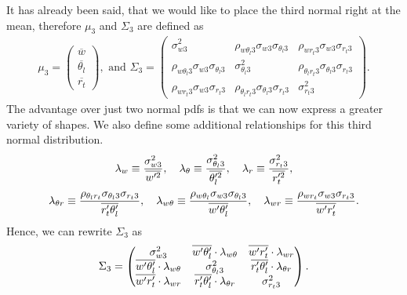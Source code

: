 It has already been said,
that we would like to place the third normal right at the mean,
therefore $\mu_3$ and $\Sigma_3$ are defined as
\begin{align}
    \mu_3 =
    \begin{pmatrix}
        \overline{w}        \\
        \overline{\theta_l} \\
        \overline{r_t}
    \end{pmatrix},
    \text{ and }
    \Sigma_3 =
    \begin{pmatrix}
        \sigma_{w 3}^2 &
        \rho_{w \theta_l 3} \sigma_{w 3} \sigma_{\theta_l 3} &
        \rho_{w r_t 3} \sigma_{w 3} \sigma_{r_t 3} \\
        \rho_{w \theta_l 3} \sigma_{w 3} \sigma_{\theta_l 3} &
        \sigma_{\theta_l 3}^2 &
        \rho_{\theta_l r_t 3} \sigma_{\theta_l 3} \sigma_{r_t 3} \\
        \rho_{w r_t 3} \sigma_{w 3} \sigma_{r_t 3} &
        \rho_{\theta_l r_t 3} \sigma_{\theta_l 3} \sigma_{r_t 3} &
        \sigma_{r_t 3}^2
    \end{pmatrix}.
\end{align}
The advantage over just two normal \glspl{pdf} is that
we can now express a greater variety of shapes.
We also define some additional relationships for this third normal distribution.
\begin{align}
    \label{eq:lambda}
    \lambda_w \equiv \frac{\sigma_{w 3}^2}{\overline{w'^2}}, \quad
    \lambda_\theta \equiv \frac{\sigma_{\theta_l 3}^2}{\overline{\theta_l'^2}}, \quad
    \lambda_r \equiv \frac{\sigma_{r_t 3}^2}{\overline{r_t'^2}},
\end{align}
\begin{align}
    \label{eq:lambda_two}
    \lambda_{\theta r} \equiv
    \frac{\rho_{\theta_l r_t} \sigma_{\theta_l 3} \sigma_{r_t 3}}{\overline{r_t' \theta_l'}}, \quad
    \lambda_{w \theta} \equiv
    \frac{\rho_{w \theta_l} \sigma_{w 3} \sigma_{\theta_l 3}}{\overline{w' \theta_l'}}, \quad
    \lambda_{w r} \equiv
    \frac{\rho_{w r_t} \sigma_{w 3} \sigma_{r_t 3}}{\overline{w' r_t'}}.
\end{align}
Hence, we can rewrite $\Sigma_3$ as
\begin{align}
    \Sigma_3 =
    \begin{pmatrix}
        \sigma_{w 3}^2 &
        \overline{w' \theta_l'} \cdot \lambda_{w \theta} &
        \overline{w' r_t'} \cdot \lambda_{w r} \\
        \overline{w' \theta_l'} \cdot \lambda_{w \theta} &
        \sigma_{\theta_l 3}^2 &
        \overline{r_t' \theta_l'} \cdot \lambda_{\theta r} \\
        \overline{w' r_t'} \cdot \lambda_{w r} &
        \overline{r_t' \theta_l'} \cdot \lambda_{\theta r} &
        \sigma_{r_t 3}^2
    \end{pmatrix}.
\end{align}